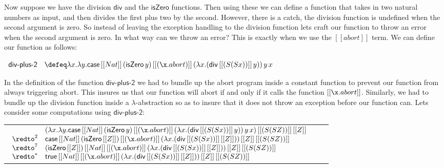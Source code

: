 \begin{example}
  Now suppose we have the division $\mathsf{div}$ and the
  $\mathsf{isZero}$ functions.  Then using these we can define a
  function that takes in two natural numbers as input, and then divides
  the first plus two by the second.  However, there is a catch, the
  division function is undefined when the second argument is zero.  So
  instead of leaving the exception handling to the division function
  lets craft our function to throw an error when the second argument
  is zero.  In what way can we throw an error?  This is exactly when
  we use the $[[abort]]$ term.  We can define our function as follows:
  \begin{center}
    \small
    \begin{math}
      \begin{array}{lll}
        \textsf{div-plus-2} & \defeq
        \lambda x.\lambda y.\mathsf{case}\,[[Nat]]\,(\mathsf{isZero}\,y)\,[[(\x.abort)]]\,(\lambda x.(\mathsf{div}\,[[(S (S x))]]\,y))\,y\,x        
      \end{array}
    \end{math}
  \end{center}
  In the definition of the function $\textsf{div-plus-2}$ we had to
  bundle up the abort program inside a constant function to prevent
  our function from always triggering abort.  This insures us that our
  function will abort if and only if it calls the function
  $[[\x.abort]]$.  Similarly, we had to bundle up the division
  function inside a $\lambda$-abstraction so as to insure that it does
  not throw an exception before our function can.  Lets consider some
  computations using $\textsf{div-plus-2}$:
  \begin{center}
    \small
    \begin{tabular}{lll}
      \begin{math}
      \begin{array}{lll}
                 & (\lambda x.\lambda y.\mathsf{case}\,[[Nat]]\,(\mathsf{isZero}\,y)\,[[(\x.abort)]]\,(\lambda x.(\mathsf{div}\,[[(S (S x))]]\,y))\,y\,x)\,[[(S (S Z))]]\,[[Z]] \\
        \redto^2 & \mathsf{case}\,[[Nat]]\,(\mathsf{isZero}\,[[Z]])\,[[(\x.abort)]]\,(\lambda x.(\mathsf{div}\,[[(S (S x))]]\,[[Z]]))\,[[Z]]\,[[(S (S Z))]] \\
        \redto^7 & (\mathsf{isZero}\,[[Z]])\,[[Nat]]\,[[(\x.abort)]]\,(\lambda x.(\mathsf{div}\,[[(S (S x))]]\,[[Z]]))\,[[Z]]\,[[(S (S Z))]] \\
        \redto^* & \mathsf{true}\,[[Nat]]\,[[(\x.abort)]]\,(\lambda x.(\mathsf{div}\,[[(S (S x))]]\,[[Z]]))\,[[Z]]\,[[(S (S Z))]] \\

\end{array}
\end{math}
\end{tabular}
\end{center}
\end{example}
